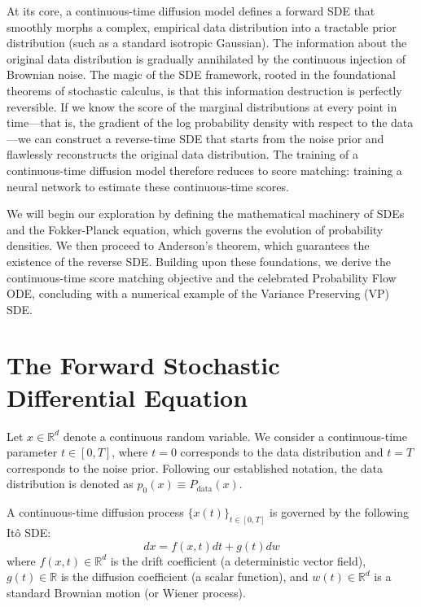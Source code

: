 At its core, a continuous-time diffusion model defines a forward SDE that smoothly morphs a complex, empirical data distribution into a tractable prior distribution (such as a standard isotropic Gaussian). The information about the original data distribution is gradually annihilated by the continuous injection of Brownian noise. The magic of the SDE framework, rooted in the foundational theorems of stochastic calculus, is that this information destruction is perfectly reversible. If we know the score of the marginal distributions at every point in time---that is, the gradient of the log probability density with respect to the data---we can construct a reverse-time SDE that starts from the noise prior and flawlessly reconstructs the original data distribution. The training of a continuous-time diffusion model therefore reduces to score matching: training a neural network to estimate these continuous-time scores.

We will begin our exploration by defining the mathematical machinery of SDEs and the Fokker-Planck equation, which governs the evolution of probability densities. We then proceed to Anderson's theorem, which guarantees the existence of the reverse SDE. Building upon these foundations, we derive the continuous-time score matching objective and the celebrated Probability Flow ODE, concluding with a numerical example of the Variance Preserving (VP) SDE.


\section{The Forward Stochastic Differential Equation}

Let $x \in \mathbb{R}^d$ denote a continuous random variable. We consider a continuous-time parameter $t \in [0, T]$, where $t=0$ corresponds to the data distribution and $t=T$ corresponds to the noise prior. Following our established notation, the data distribution is denoted as $p_0(x) \equiv P_{\text{data}}(x)$.

A continuous-time diffusion process $\{x(t)\}_{t \in [0, T]}$ is governed by the following It\^{o} SDE:
\begin{equation}
\label{eq:forward_sde}
dx = f(x, t) dt + g(t) dw
\end{equation}
where $f(x, t) \in \mathbb{R}^d$ is the drift coefficient (a deterministic vector field), $g(t) \in \mathbb{R}$ is the diffusion coefficient (a scalar function), and $w(t) \in \mathbb{R}^d$ is a standard Brownian motion (or Wiener process). 

